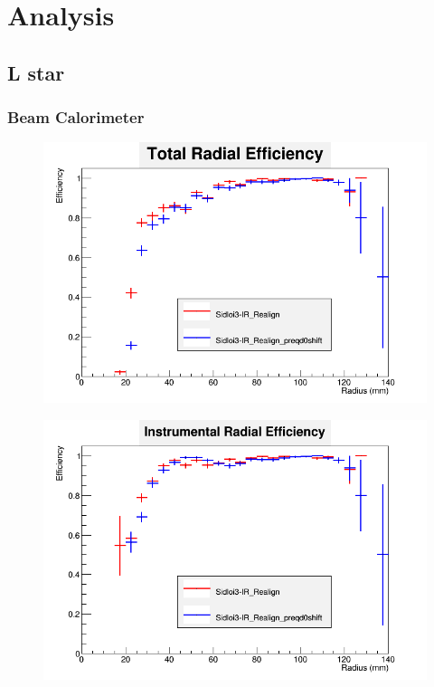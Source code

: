 \documentclass{report}
\begin{document}
    \chapter{Analysis}
        \section{L star}
            \subsection{Beam Calorimeter}
                \begin{figure}[H] 
                    \includegraphics[width=\textwidth]{RadialEfficiencyFP_total}
                    \centering
                    \caption{}
                    \label{fig:lstar_beamcal_total}
                \end{figure}
                \begin{figure}[H]
                    \includegraphics[width=\textwidth]{RadialEfficiencyFP_instrumental}
                    \centering
                    \caption{}
                    \label{fig:lstar_beamcal_inst}
                \end{figure}
\end{document}
